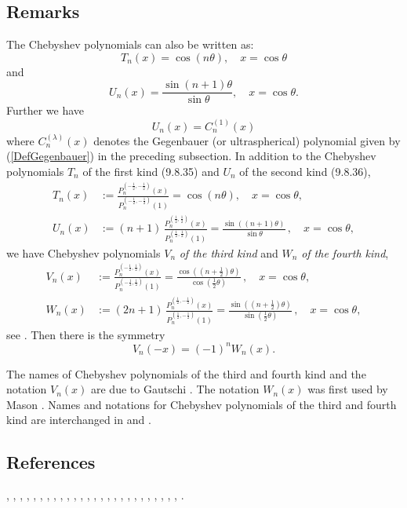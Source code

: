 \documentclass[envcountchap,graybox]{svmono}
\newcommand\tha\theta
\newcommand\half{\frac12}
\newcommand\thalf{\tfrac12}
\begin{document}
\subsection*{Remarks}
The Chebyshev polynomials can also be written as:
$$T_n(x)=\cos(n\theta),\quad x=\cos\theta$$
and
$$U_n(x)=\frac{\sin (n+1)\theta}{\sin\theta},\quad x=\cos\theta.$$
Further we have
$$U_n(x)=C_n^{(1)}(x)$$
where $C_n^{(\lambda)}(x)$ denotes the Gegenbauer (or ultraspherical)
polynomial given by (\ref{DefGegenbauer}) in the preceding subsection.
In addition to the Chebyshev polynomials $T_n$ of the first kind (9.8.35)
and $U_n$ of the second kind (9.8.36),
\begin{align}
T_n(x)&:=\frac{P_n^{(-\half,-\half)}(x)}{P_n^{(-\half,-\half)}(1)}
=\cos(n\tha),\quad x=\cos\tha,\\
U_n(x)&:=(n+1)\,\frac{P_n^{(\half,\half)}(x)}{P_n^{(\half,\half)}(1)}
=\frac{\sin((n+1)\tha)}{\sin\tha}\,,\quad x=\cos\tha,
\end{align}
we have Chebyshev polynomials $V_n$ {\em of the third kind}
and $W_n$ {\em of the fourth kind},
\begin{align}
V_n(x)&:=\frac{P_n^{(-\half,\half)}(x)}{P_n^{(-\half,\half)}(1)}
=\frac{\cos((n+\thalf)\tha)}{\cos(\thalf\tha)}\,,\quad x=\cos\tha,\\
W_n(x)&:=(2n+1)\,\frac{P_n^{(\half,-\half)}(x)}{P_n^{(\half,-\half)}(1)}
=\frac{\sin((n+\thalf)\tha)}{\sin(\thalf\tha)}\,,\quad x=\cos\tha,
\end{align}
see \cite[Section 1.2.3]{K20}. Then there is the symmetry
\begin{equation}
V_n(-x)=(-1)^n W_n(x).
\label{140}
\end{equation}

The names of Chebyshev polynomials of the third and fourth kind
and the notation $V_n(x)$ are due to Gautschi \cite{K21}.
The notation $W_n(x)$ was first used by Mason \cite{K22}.
Names and notations for Chebyshev polynomials of the third and fourth
kind are interchanged in  and
.
%
\subsection*{References}
\cite{Abram}, \cite{AskeyFitch}, \cite{AskeyGasperHarris}, \cite{AskeyIsmail76},
\cite{Bavinck95}, \cite{Chihara78}, \cite{Danese}, \cite{DilcherStolarsky},
\cite{Erdelyi+}, \cite{Grad}, \cite{HartmannStephan}, \cite{Ismail2005II}, \cite{Koekoek2000},
\cite{Luke}, \cite{Mathai}, \cite{Nikiforov+}, \cite{NikiforovUvarov}, \cite{Rainville},
\cite{Rayes+}, \cite{Rivlin}, \cite{SainteViennot}, \cite{Szego75}, \cite{Temme},
\cite{Wilson70I}, \cite{Zayed}, \cite{Zhang}, \cite{ZhangWang}.
\end{document}
